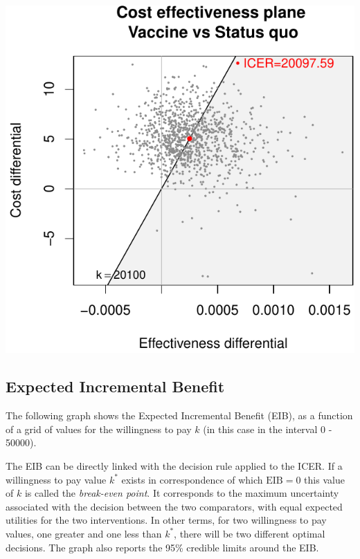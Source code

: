 \documentclass[]{article}
\begin{document}
\begin{center}\includegraphics{report_files/figure-latex/unnamed-chunk-3-1} \end{center}

\hypertarget{expected-incremental-benefit}{%
\subsection{Expected Incremental
Benefit}\label{expected-incremental-benefit}}

The following graph shows the Expected Incremental Benefit (EIB), as a
function of a grid of values for the willingness to pay \(k\) (in this
case in the interval 0 - 50000).

The EIB can be directly linked with the decision rule applied to the
ICER. If a willingness to pay value \(k^*\) exists in correspondence of
which \(\mbox{EIB}=0\) this value of \(k\) is called the
\emph{break-even point}. It corresponds to the maximum uncertainty
associated with the decision between the two comparators, with equal
expected utilities for the two interventions. In other terms, for two
willingness to pay values, one greater and one less than \(k^*\), there
will be two different optimal decisions. The graph also reports the 95\%
credible limits around the EIB.
\end{document}
